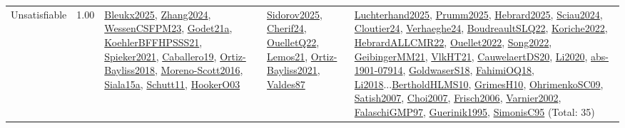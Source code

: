 {\begin{longtable}{p{3cm}r>{\raggedright\arraybackslash}p{6cm}>{\raggedright\arraybackslash}p{6cm}>{\raggedright\arraybackslash}p{8cm}}
\index{Unsatisfiable}\index{Concepts!Unsatisfiable}Unsatisfiable &  1.00 & \hyperref[detail:Bleukx2025]{Bleukx2025}, \hyperref[detail:Zhang2024]{Zhang2024}, \hyperref[detail:WessenCSFPM23]{WessenCSFPM23}, \hyperref[detail:Godet21a]{Godet21a}, \hyperref[detail:KoehlerBFFHPSSS21]{KoehlerBFFHPSSS21}, \hyperref[detail:Spieker2021]{Spieker2021}, \hyperref[detail:Caballero19]{Caballero19}, \hyperref[detail:Ortiz-Bayliss2018]{Ortiz-Bayliss2018}, \hyperref[detail:Moreno-Scott2016]{Moreno-Scott2016}, \hyperref[detail:Siala15a]{Siala15a}, \hyperref[detail:Schutt11]{Schutt11}, \hyperref[detail:HookerO03]{HookerO03} & \hyperref[detail:Sidorov2025]{Sidorov2025}, \hyperref[detail:Cherif24]{Cherif24}, \hyperref[detail:OuelletQ22]{OuelletQ22}, \hyperref[detail:Lemos21]{Lemos21}, \hyperref[detail:Ortiz-Bayliss2021]{Ortiz-Bayliss2021}, \hyperref[detail:Valdes87]{Valdes87} & \hyperref[detail:Luchterhand2025]{Luchterhand2025}, \hyperref[detail:Prumm2025]{Prumm2025}, \hyperref[detail:Hebrard2025]{Hebrard2025}, \hyperref[detail:Sciau2024]{Sciau2024}, \hyperref[detail:Cloutier24]{Cloutier24}, \hyperref[detail:Verhaeghe24]{Verhaeghe24}, \hyperref[detail:BoudreaultSLQ22]{BoudreaultSLQ22}, \hyperref[detail:Koriche2022]{Koriche2022}, \hyperref[detail:HebrardALLCMR22]{HebrardALLCMR22}, \hyperref[detail:Ouellet2022]{Ouellet2022}, \hyperref[detail:Song2022]{Song2022}, \hyperref[detail:GeibingerMM21]{GeibingerMM21}, \hyperref[detail:VlkHT21]{VlkHT21}, \hyperref[detail:CauwelaertDS20]{CauwelaertDS20}, \hyperref[detail:Li2020]{Li2020}, \hyperref[detail:abs-1901-07914]{abs-1901-07914}, \hyperref[detail:GoldwaserS18]{GoldwaserS18}, \hyperref[detail:FahimiOQ18]{FahimiOQ18}, \hyperref[detail:Li2018]{Li2018}...\hyperref[detail:BertholdHLMS10]{BertholdHLMS10}, \hyperref[detail:GrimesH10]{GrimesH10}, \hyperref[detail:OhrimenkoSC09]{OhrimenkoSC09}, \hyperref[detail:Satish2007]{Satish2007}, \hyperref[detail:Choi2007]{Choi2007}, \hyperref[detail:Frisch2006]{Frisch2006}, \hyperref[detail:Varnier2002]{Varnier2002}, \hyperref[detail:FalaschiGMP97]{FalaschiGMP97}, \hyperref[detail:Guerinik1995]{Guerinik1995}, \hyperref[detail:SimonisC95]{SimonisC95} (Total: 35)\\

\end{longtable}}
